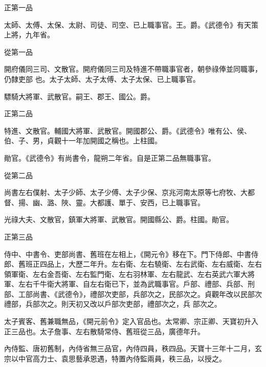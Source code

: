 \begin{pinyinscope}
 正第一品



 太師、太傅、太保、太尉、司徒、司空、已上職事官。王。爵。《武德令》有天策上將，九年省。



 從第一品



 開府儀同三司、文散官。開府儀同三司及特進不帶職事官者，朝參祿俸並同職事，仍隸吏部
 也。太子太師、太子太傅、太子太保、已上職事官。



 驃騎大將軍、武散官。嗣王、郡王、國公。爵。



 正第二品



 特進、文散官。輔國大將軍、武散官。開國郡公、爵。《武德令》唯有公、侯、伯、子、男，貞觀十一年加開國之稱也。上柱國。



 勛官。《武德令》有尚書令，龍朔二年省。自是正第二品無職事官。



 從第二品



 尚書左右僕射、太子少師、太子少傅、太子少保、京兆河南太原等七府牧、大都督、揚、幽、潞、陜、靈。大都護、單于、安西，已上職事官。



 光祿大夫、文散官，鎮軍大將軍、武散官。開國縣公、爵。柱國。勛官。



 正第三品



 侍中、中書令、吏部尚書、舊班在左相上，《開元令》移在下。門下侍郎、中書侍郎、舊班正四品上，大歷二年升。左右衛、左右驍衛、左右武衛、左右威衛、左右領軍衛、左右金吾衛、左右監門衛、左右羽林軍、左右龍武、左右英武六軍大將軍、左右千牛衛大將軍、自左右衛已下，並為武職事官。戶部、禮部、兵部、刑部、工部尚書、《武德令》，禮部次吏部，兵部次之，民部次之。貞觀年改以民部次禮部，兵部次之。則天初又改以戶部次吏部，禮部次之，兵
 部次之。



 太子賓客、舊兼職無品，《開元前令》定入官品也。太常卿、宗正卿、天寶初升入正三品也。太子詹事、左右散騎常侍、舊班從三品，廣德年升。



 內侍監、唐初舊制，內侍省無三品官，內侍四員，秩四品。天寶十三年十二月，玄宗以中官高力士、袁思藝承恩遇，特置內侍監兩員，秩三品，以授之。




\end{pinyinscope}
